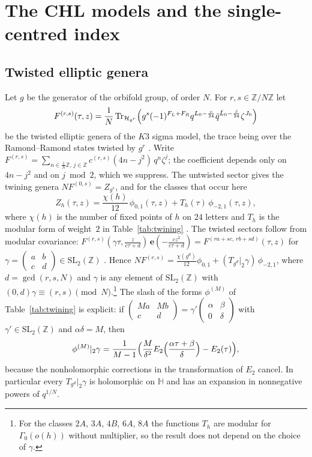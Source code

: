 \documentclass[11pt]{amsart}
\theoremstyle{definition}
\newcommand{\ZZ}{\mathbb{Z}}
\newcommand{\HH}{\mathbb{H}}
\newcommand{\e}{\mathbf{e}}
\newcommand{\SL}{\mathrm{SL}_2(\ZZ)}
\begin{document}
\section{The CHL models and the single-centred index}\label{sec:chl}

\subsection{Twisted elliptic genera}
Let $g$ be the generator of the orbifold group, of order $N$. For $r,s\in\ZZ/N\ZZ$ let
\[
F^{(r,s)}(\tau,z)=\frac1N\,\mathrm{Tr}_{\mathcal H_{g^r}}\Bigl(g^s(-1)^{F_L+F_R}q^{L_0-\frac c{24}}\bar q^{\bar L_0-\frac{\bar c}{24}}\zeta^{J_0}\Bigr)
\]
be the twisted elliptic genera of the $K3$ sigma model, the trace being over the Ramond--Ramond states twisted by $g^r$ \cite{DJS06,DJS07}. Write $F^{(r,s)}=\sum_{n\in\frac1N\ZZ,\,j\in\ZZ}c^{(r,s)}(4n-j^2)\,q^n\zeta^j$; the coefficient depends only on $4n-j^2$ and on $j\bmod2$, which we suppress. The untwisted sector gives the twining genera $NF^{(0,s)}=Z_{g^s}$, and for the classes that occur here
\begin{equation}\label{eq:twining}
Z_h(\tau,z)=\frac{\chi(h)}{12}\,\phi_{0,1}(\tau,z)+T_h(\tau)\,\phi_{-2,1}(\tau,z),
\end{equation}
where $\chi(h)$ is the number of fixed points of $h$ on $24$ letters and $T_h$ is the modular form of weight~$2$ in Table~\ref{tab:twining} \cite{Che10}. The twisted sectors follow from modular covariance: $F^{(r,s)}(\gamma\tau,\frac z{c\tau+d})\,\e(-\frac{cz^2}{c\tau+d})=F^{(ra+sc,\,rb+sd)}(\tau,z)$ for $\gamma=\left(\begin{smallmatrix}a&b\\c&d\end{smallmatrix}\right)\in\SL$ \cite{DJS07}. Hence $NF^{(r,s)}=\frac{\chi(g^d)}{12}\phi_{0,1}+(T_{g^d}|_2\gamma)\,\phi_{-2,1}$, where $d=\gcd(r,s,N)$ and $\gamma$ is any element of $\SL$ with $(0,d)\gamma\equiv(r,s)\pmod N$.\footnote{For the classes $2A$, $3A$, $4B$, $6A$, $8A$ the functions $T_h$ are modular for $\Gamma_0(o(h))$ without multiplier, so the result does not depend on the choice of $\gamma$.} The slash of the forms $\phi^{(M)}$ of Table~\ref{tab:twining} is explicit: if $\left(\begin{smallmatrix}Ma&Mb\\c&d\end{smallmatrix}\right)=\gamma'\left(\begin{smallmatrix}\alpha&\beta\\0&\delta\end{smallmatrix}\right)$ with $\gamma'\in\SL$ and $\alpha\delta=M$, then
\[
\phi^{(M)}|_2\gamma=\frac1{M-1}\Bigl(\frac M{\delta^2}E_2\Bigl(\frac{\alpha\tau+\beta}{\delta}\Bigr)-E_2(\tau)\Bigr),
\]
because the nonholomorphic corrections in the transformation of $E_2$ cancel. In particular every $T_{g^d}|_2\gamma$ is holomorphic on $\HH$ and has an expansion in nonnegative powers of $q^{1/N}$.
\end{document}
